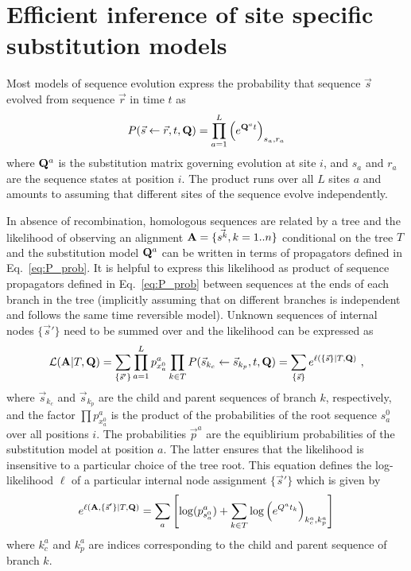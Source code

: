 \documentclass[aps,rmp, onecolumn]{revtex4}
\newcommand{\bq}{\begin{equation}}
\newcommand{\eq}{\end{equation}}
\newcommand{\mat}[1]{{\bf #1}}
\newcommand{\eqp}{p}
\newcommand{\LH}{\mathcal{L}}
\newcommand{\lh}{\ell}
\begin{document}
\section*{Efficient inference of site specific substitution models}
Most models of sequence evolution express the probability that sequence $\vec{s}$ evolved from sequence $\vec{r}$ in time $t$ as
\bq
P(\vec{s}\leftarrow \vec{r},t,\mat{Q}) = \prod_{a=1}^L \left(e^{\mat{Q}^{a} t}\right)_{s_{a},r_{a}}
\label{eq:P_prob}
\eq
where $\mat{Q}^{a}$ is the substitution matrix governing evolution at site $i$, and $s_{a}$ and $r_{a}$ are the sequence states at position $i$.
The product runs over all $L$ sites $a$ and amounts to assuming that different sites of the sequence evolve independently.

In absence of recombination, homologous sequences are related by a tree and the likelihood of observing an alignment $\mat{A}=\{\vec{s^k}, k=1..n\}$ conditional on the tree $T$ and the substitution model $\mat{Q}^{a}$ can be written in terms of propagators defined in Eq.~\ref{eq:P_prob}.
It is helpful to express this likelihood as product of sequence propagators defined in Eq.~\ref{eq:P_prob} between sequences at the ends of each branch in the tree (implicitly assuming that on different branches is independent and follows the same time reversible model).
Unknown sequences of internal nodes $\{\vec{s}'\}$ need to be summed over and the likelihood can be expressed as
\begin{equation}
	\LH(\mat{A}|T,\mat{Q}) = \sum_{\{\vec{s}'\}}\prod_{a=1}^L \eqp^{a}_{x^{0}_a} \prod_{k\in T}P(\vec{s}_{k_c}\leftarrow \vec{s}_{k_p},t,\mat{Q}) = \sum_{\{\vec{s}\}} e^{\lh(\{\vec{s}\} |T, \mat{Q})}  \ ,
	\label{eq:LH}
\end{equation}
where $\vec{s}_{k_c}$ and $\vec{s}_{k_p}$ are the child and parent sequences of branch $k$, respectively, and the factor $\prod \eqp^{a}_{x^{0}_a}$ is the product of the probabilities of the root sequence $s^{0}_a$ over all positions $i$.
The probabilities $\vec{\eqp}^{a}$ are the equiblirium probabilities of the substitution model at position $a$.
The latter ensures that the likelihood is insensitive to a particular choice of the tree root.
This equation defines the log-likelihood $\lh$ of a particular internal node assignment $\{\vec{s}'\}$ which is given by
\begin{equation}
	e^{\lh(\mat{A}, \{\vec{s}'\} |T, \mat{Q})} = \sum_a \left[\log(\eqp^a_{s^{0}_a}) + \sum_{k\in T} \log\left( e^{Q^at_k} \right)_{k^a_c, k^a_p}\right]
\end{equation}
where $k^a_c$ and $k^a_p$ are indices corresponding to the child and parent sequence of branch $k$.
\end{document}
